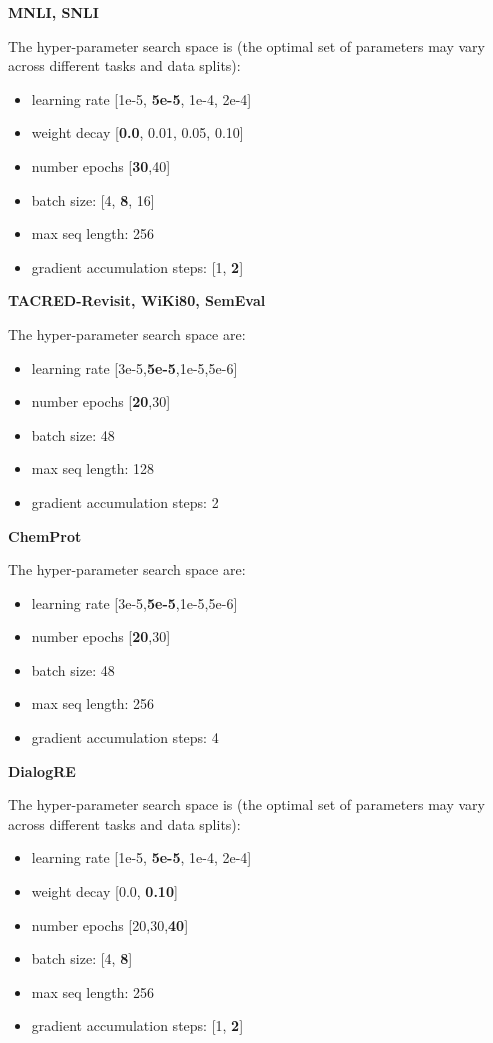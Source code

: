 \documentclass{article} \usepackage{iclr2022_conference,times}
\begin{document}
\textbf{MNLI, SNLI}

The hyper-parameter search space is (the optimal set of parameters may vary across different tasks and data splits):
\begin{itemize}
\item learning rate
[1e-5, \textbf{5e-5}, 1e-4, 2e-4]
\item weight decay
[\textbf{0.0}, 0.01, 0.05, 0.10]
\item number epochs [\textbf{30},40]
\item batch size: [4, \textbf{8}, 16]
\item max seq length: 256
\item gradient accumulation steps: [1, \textbf{2}]
\end{itemize}

\textbf{TACRED-Revisit, WiKi80, SemEval}

The hyper-parameter search space are:
\begin{itemize}
\item learning rate
[3e-5,\textbf{5e-5},1e-5,5e-6]
\item number epochs [\textbf{20},30]
\item batch size: 48
\item max seq length: 128
\item gradient accumulation steps: 2
\end{itemize}

\textbf{ChemProt}

The hyper-parameter search space are:
\begin{itemize}
\item learning rate
[3e-5,\textbf{5e-5},1e-5,5e-6]
\item number epochs [\textbf{20},30]
\item batch size: 48
\item max seq length: 256
\item gradient accumulation steps: 4
\end{itemize}

\textbf{DialogRE}

The hyper-parameter search space is (the optimal set of parameters may vary across different tasks and data splits):
\begin{itemize}
\item learning rate
[1e-5, \textbf{5e-5}, 1e-4, 2e-4]
\item weight decay
[0.0, \textbf{0.10}]
\item number epochs [20,30,\textbf{40}]
\item batch size: [4, \textbf{8}]
\item max seq length: 256
\item gradient accumulation steps: [1, \textbf{2}]
\end{itemize}
\end{document}
